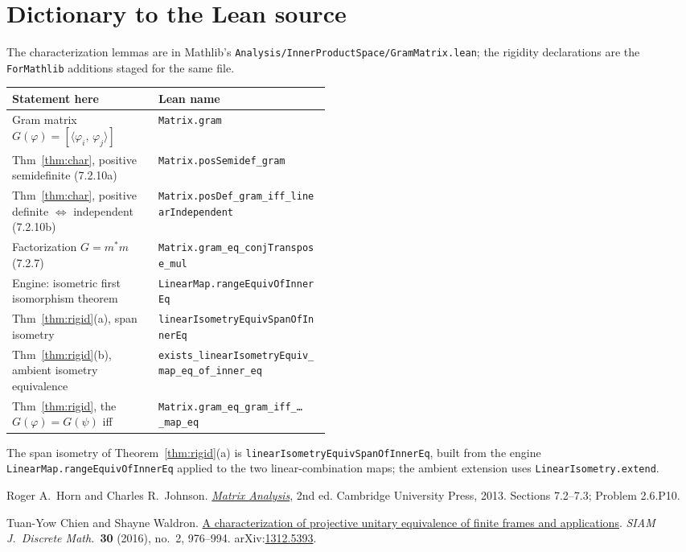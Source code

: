 \documentclass[11pt]{article}
\newcommand{\inner}[2]{\langle #1,\,#2\rangle}
\newcommand{\adj}{^{*}}
\newcommand{\gram}{G}
\theoremstyle{remark}
\begin{document}
\section{Dictionary to the Lean source}

The characterization lemmas are in Mathlib's
\texttt{Analysis/InnerProductSpace/GramMatrix.lean}; the rigidity declarations are
the \texttt{ForMathlib} additions staged for the same file.

\begin{center}
\footnotesize
\setlength{\tabcolsep}{4pt}
\begin{tabular}{@{}p{0.46\linewidth}l@{}}
\toprule
Statement here & Lean name \\
\midrule
Gram matrix $\gram(\varphi)=[\inner{\varphi_i}{\varphi_j}]$
  & \texttt{Matrix.gram} \\
Thm~\ref{thm:char}, positive semidefinite (7.2.10a)
  & \texttt{Matrix.posSemidef\_gram} \\
Thm~\ref{thm:char}, positive definite $\iff$ independent (7.2.10b)
  & \texttt{Matrix.posDef\_gram\_iff\_linearIndependent} \\
Factorization $\gram=m\adj m$ (7.2.7)
  & \texttt{Matrix.gram\_eq\_conjTranspose\_mul} \\
Engine: isometric first isomorphism theorem
  & \texttt{LinearMap.rangeEquivOfInnerEq} \\
Thm~\ref{thm:rigid}(a), span isometry
  & \texttt{linearIsometryEquivSpanOfInnerEq} \\
Thm~\ref{thm:rigid}(b), ambient isometry equivalence
  & \texttt{exists\_linearIsometryEquiv\_map\_eq\_of\_inner\_eq} \\
Thm~\ref{thm:rigid}, the $\gram(\varphi)=\gram(\psi)$ iff
  & \texttt{Matrix.gram\_eq\_gram\_iff\_\dots\_map\_eq} \\
\bottomrule
\end{tabular}
\end{center}

The span isometry of Theorem~\ref{thm:rigid}(a) is
\texttt{linearIsometryEquivSpanOfInnerEq}, built from the engine
\texttt{LinearMap.rangeEquivOfInnerEq} applied to the two linear-combination maps;
the ambient extension uses \texttt{LinearIsometry.extend}.

\begin{thebibliography}{9}
Roger A.\ Horn and Charles R.\ Johnson.
\newblock \href{https://doi.org/10.1017/CBO9781139020411}{\emph{Matrix Analysis}}, 2nd ed.
\newblock Cambridge University Press, 2013.
\newblock Sections 7.2--7.3; Problem 2.6.P10.

Tuan-Yow Chien and Shayne Waldron.
\newblock \href{https://doi.org/10.1137/15M1042140}{A characterization of projective unitary equivalence of finite frames and applications}.
\newblock \emph{SIAM J.\ Discrete Math.}\ \textbf{30} (2016), no.\ 2, 976--994.
\newblock arXiv:\href{https://arxiv.org/abs/1312.5393}{1312.5393}.
\end{thebibliography}
\end{document}
